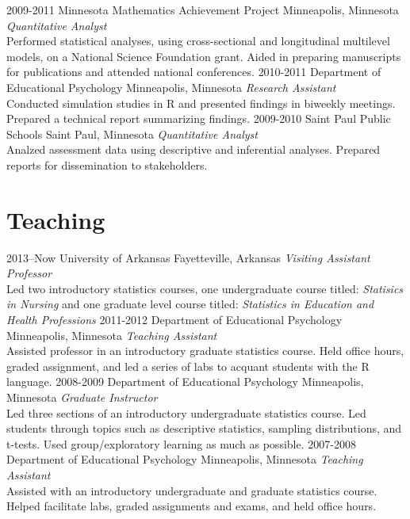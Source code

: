 \documentclass[]{friggeri-cv} %
\begin{document}
\begin{entrylist}
\entry
{2009-2011}
{Minnesota Mathematics Achievement Project}
{Minneapolis, Minnesota}
{\emph{Quantitative Analyst} \\
Performed statistical analyses, using cross-sectional and longitudinal multilevel models, on a National Science Foundation grant. Aided in preparing manuscripts for publications and attended national conferences.}
\entry
{2010-2011}
{Department of Educational Psychology}
{Minneapolis, Minnesota}
{\emph{Research Assistant} \\
Conducted simulation studies in R and presented findings in biweekly meetings.  Prepared a technical report summarizing findings.}
\entry
{2009-2010}
{Saint Paul Public Schools}
{Saint Paul, Minnesota}
{\emph{Quantitative Analyst} \\
Analzed assessment data using descriptive and inferential analyses. Prepared reports for dissemination to stakeholders.}
\end{entrylist}

\newpage 
\section{Teaching}

\begin{entrylist}
\entry
{2013--Now}
{University of Arkansas}
{Fayetteville, Arkansas}
{\emph{Visiting Assistant Professor} \\
Led two introductory statistics courses, one undergraduate course titled: \textit{Statisics in Nursing} and one graduate level course titled: \textit{Statistics in Education and Health Professions}}
\entry
{2011-2012}
{Department of Educational Psychology}
{Minneapolis, Minnesota}
{\emph{Teaching Assistant} \\
Assisted professor in an introductory graduate statistics course. Held office hours, graded assignment, and led a series of labs to acquant students with the R language.}
\entry
{2008-2009}
{Department of Educational Psychology}
{Minneapolis, Minnesota}
{\emph{Graduate Instructor} \\
Led three sections of an introductory undergraduate statistics course. Led students through topics such as descriptive statistics, sampling distributions, and t-tests. Used group/exploratory learning as much as possible.}
\entry
{2007-2008}
{Department of Educational Psychology}
{Minneapolis, Minnesota}
{\emph{Teaching Assistant} \\
Assisted with an introductory undergraduate and graduate statistics course. Helped facilitate labs, graded assignments and exams, and held office hours.}
\end{entrylist}
\end{document}

